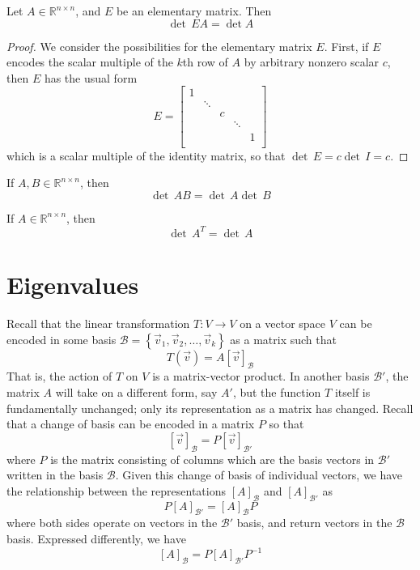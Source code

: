 \begin{prop}
Let $A \in \mathbb{R}^{n\times n}$, and $E$ be an elementary matrix. Then \[ \det \, EA = \det A \]
\end{prop}
\begin{proof}
We consider the possibilities for the elementary matrix $E$. First, if $E$ encodes the scalar multiple of the $k$th row of $A$ by arbitrary nonzero scalar $c$, then $E$ has the usual form \[ E = \left[ \begin{array}{ccccc}
1 & &  & & \\
& \ddots & &  & \\
& & c & & \\
& & & \ddots & \\
& & & & 1 \\
  \end{array} \right] \]
  which is a scalar multiple of the identity matrix, so that $ \det \, E = c \det \, I = c $.
\end{proof}



\begin{theorem}
If $A, B \in \mathbb{R}^{n\times n}$, then \[ \det \, AB = \det\, A \det\, B \]
\end{theorem}

\begin{theorem}
If $A\in \mathbb{R}^{n\times n}$, then \[ \det \, A^T = \det\, A \]
\end{theorem}







\chapter{Eigenvalues}

Recall that the linear transformation $T:V\rightarrow V$ on a vector space $V$ can be encoded in some basis $\mathcal{B} = \left\{\vec{v}_1, \vec{v}_2,\ldots, \vec{v}_k\right\}$ as a matrix such that \[ T\left(\vec{v}\right) = A \left[ \vec{v}\right]_{\mathcal{B}} \] That is, the action of $T$ on $V$ is a matrix-vector product. In another basis $\mathcal{B}'$, the matrix $A$ will take on a different form, say $A'$, but the function $T$ itself is fundamentally unchanged; only its representation as a matrix has changed. Recall that a change of basis can be encoded in a matrix $P$ so that \[ \left[\vec{v}\right]_{\mathcal{B}} = P \left[ \vec{v}\right]_{\mathcal{B}'}\] where $P$ is the matrix consisting of columns which are the basis vectors in $\mathcal{B}'$ written in the basis $\mathcal{B}$. Given this change of basis of individual vectors, we have the relationship between the representations $\left[A\right]_{\mathcal{B}}$ and $\left[A\right]_{\mathcal{B}'}$ as \[ P \left[ A\right]_{\mathcal{B}'} = \left[A\right]_{\mathcal{B}} P \] where both sides operate on vectors in the $\mathcal{B}'$ basis, and return vectors in the $\mathcal{B}$ basis. Expressed differently, we have \[ \left[A\right]_{\mathcal{B}} = P \left[A\right]_{\mathcal{B}'} P^{-1} \]

